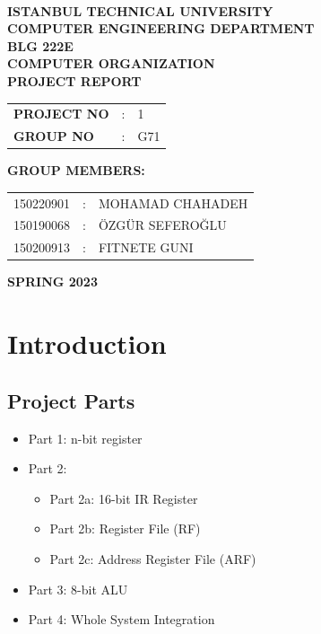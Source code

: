 \documentclass[pdftex,12pt,a4paper]{article}
\begin{document}
\begin{titlepage}
\begin{center}
\textbf{}\\
\textbf{\Large{ISTANBUL TECHNICAL UNIVERSITY}}\\
\vspace{0.5cm}
\textbf{\Large{COMPUTER ENGINEERING DEPARTMENT}}\\
\vspace{2cm}
\textbf{\Large{BLG 222E\\ COMPUTER ORGANIZATION\\ PROJECT REPORT}}\\
\vspace{2.8cm}
\begin{table}[ht]
\centering
\Large{
\begin{tabular}{lcl}
\textbf{PROJECT NO}  & : & 1 \\
\textbf{GROUP NO}  & : & G71 \\
\end{tabular}}
\end{table}
\vspace{1cm}
\textbf{\Large{GROUP MEMBERS:}}\\
\begin{table}[ht]
\centering
\Large{
\begin{tabular}{rcl}
150220901  & : & MOHAMAD CHAHADEH \\
150190068  & : & ÖZGÜR SEFEROĞLU \\
150200913  & : & FITNETE GUNI
\end{tabular}}
\end{table}
\vspace{2.8cm}
\textbf{\Large{SPRING 2023}}

\end{center}

\end{titlepage}

\thispagestyle{empty}
\setcounter{tocdepth}{4}
\tableofcontents
\clearpage

\section{Introduction}

\subsection{Project Parts}
\begin{itemize}
\item Part 1: n-bit register
\item Part 2: \begin{itemize}
\item Part 2a: 16-bit IR Register
\item Part 2b: Register File (RF)
\item Part 2c: Address Register File (ARF)
\end{itemize}
\item Part 3: 8-bit ALU
\item Part 4: Whole System Integration
\end{itemize}
\end{document}
